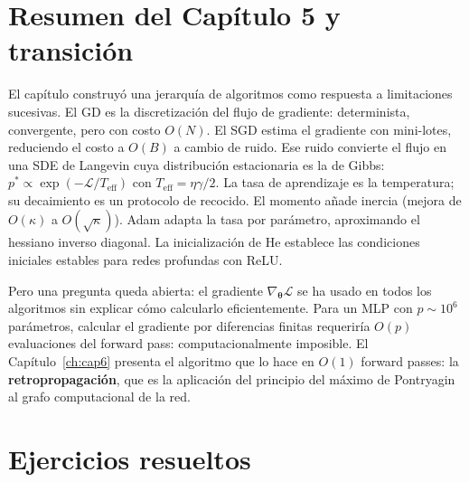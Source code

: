 \section{Resumen del Capítulo 5 y transición}
\label{sec:resumen5}

El capítulo construyó una jerarquía de algoritmos como respuesta a
limitaciones sucesivas. El GD es la discretización del flujo de gradiente:
determinista, convergente, pero con costo $O(N)$. El SGD estima el
gradiente con mini-lotes, reduciendo el costo a $O(B)$ a cambio de
ruido. Ese ruido convierte el flujo en una SDE de Langevin cuya
distribución estacionaria es la de Gibbs:
$p^* \propto \exp(-\mathcal{L}/T_{\text{eff}})$ con
$T_{\text{eff}} = \eta\gamma/2$. La tasa de aprendizaje es la
temperatura; su decaimiento es un protocolo de recocido. El momento
añade inercia (mejora de $O(\kappa)$ a $O(\sqrt{\kappa})$). Adam
adapta la tasa por parámetro, aproximando el hessiano inverso diagonal.
La inicialización de He establece las condiciones iniciales estables
para redes profundas con ReLU.

Pero una pregunta queda abierta: el gradiente
$\nabla_{\bm{\theta}}\mathcal{L}$ se ha usado en todos los algoritmos
sin explicar cómo calcularlo eficientemente. Para un MLP con $p \sim 10^6$
parámetros, calcular el gradiente por diferencias finitas requeriría
$O(p)$ evaluaciones del forward pass: computacionalmente imposible. El
Capítulo~\ref{ch:cap6} presenta el algoritmo que lo hace en $O(1)$
forward passes: la \textbf{retropropagación}, que es la aplicación del
principio del máximo de Pontryagin al grafo computacional de la red.

\section*{Ejercicios resueltos}

